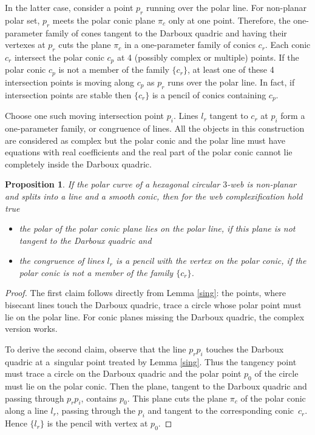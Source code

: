 \documentclass[pdftex]{sigma}
\numberwithin{equation}{section}
\newtheorem{Proposition}[Theorem]{Proposition}
 { \theoremstyle{definition}
\newtheorem{Definition}[Theorem]{Definition}
\newtheorem{Note}[Theorem]{Note}
\newtheorem{Example}[Theorem]{Example}
\newtheorem{Remark}[Theorem]{Remark} }
\begin{document}
In the latter case, consider a point $p_r$ running over the polar line. For non-planar polar set, $p_r$ meets the polar conic plane $\pi_c$ only at one point. Therefore, the one-parameter family of cones tangent to the Darboux quadric and having their vertexes at $p_r$ cuts the plane $\pi_c$ in a one-parameter family of conics $c_r$. Each conic $c_r$ intersect the polar conic $c_p$ at 4 (possibly complex or multiple) points. If the polar conic $c_p$ is not a member of the family $\{c_r\}$, at least one of these 4 intersection points is moving along $c_p$ as $p_r$ runs over the polar line. In fact, if intersection points are stable then $\{c_r\}$ is a pencil of conics containing $c_p$.

Choose one such moving intersection point $p_i$. Lines $l_r$ tangent to $c_r$ at $p_i$ form a one-parameter family, or congruence of lines. All the objects in this construction are considered as complex but the polar conic and the polar line must have equations with real coefficients and the real part of the polar conic cannot lie completely inside the Darboux quadric.

\begin{Proposition}\label{geometryconic}
If the polar curve of a hexagonal circular $3$-web is non-planar and splits into a line and a smooth conic, then for the web complexification hold true
\begin{itemize}\itemsep=0pt
\item[$(1)$] the polar of the polar conic plane lies on the polar line, if this plane is not tangent to the Darboux quadric and
\item[$(2)$] the congruence of lines $l_r$ is a pencil with the vertex on the polar conic, if the polar conic is not a member of the family $\{c_r\}$.
\end{itemize}
\end{Proposition}
\begin{proof}
 The first claim follows directly from Lemma \ref{sing}: the points, where bisecant lines touch the Darboux quadric, trace a circle whose polar point must lie on the polar line. For conic planes missing the Darboux quadric, the complex version works.

To derive the second claim, observe that the line $p_rp_i$ touches the Darboux quadric at a~singular point treated by Lemma \ref{sing}. Thus the tangency point must trace a circle on the Darboux quadric and the polar point $p_0$ of the circle must lie on the polar conic. Then the plane, tangent to the Darboux quadric and passing through $p_rp_i$, contains $p_0$. This plane cuts the plane $\pi_c$ of the polar conic along a line $l_r$, passing through the $p_i$ and tangent to the corresponding conic~$c_r$. Hence $\{l_r\}$ is the pencil with vertex at $p_0$.
\end{proof}
\end{document}
